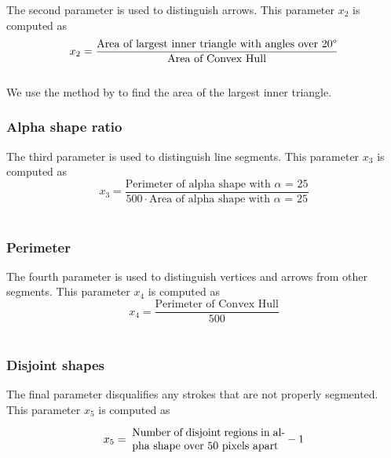The second parameter is used to distinguish arrows. This parameter $x_2$ is computed as \\

\begin{equation}
	x_2 = \frac{\text{Area of largest inner triangle with angles over 20\textdegree}}{\text{Area of Convex Hull}}
\end{equation} \\

We use the method by \citeauthor{largesttriangle} \cite{largesttriangle} to find the area of the largest inner triangle.

\subsubsection{Alpha shape ratio}

The third parameter is used to distinguish line segments. This parameter $x_3$ is computed as \\

\begin{equation}
	x_3 = \frac{\text{Perimeter of alpha shape with $\alpha$ = 25}}{500 \cdot \text{Area of alpha shape with $\alpha$ = 25}}
\end{equation} \\

\subsubsection{Perimeter}

The fourth parameter is used to distinguish vertices and arrows from other segments. This parameter $x_4$ is computed as \\

\begin{equation}
	x_4 = \frac{\text{Perimeter of Convex Hull}}{\text{500}}
\end{equation} \\

\subsubsection{Disjoint shapes}

The final parameter disqualifies any strokes that are not properly segmented. This parameter $x_5$ is computed as

\begin{equation}
	x_5 = \; \parbox{14em}{Number of disjoint regions in alpha shape over 50 pixels apart} - 1
\end{equation}

